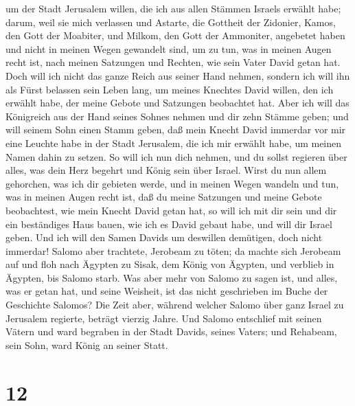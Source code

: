 um der Stadt Jerusalem willen, die ich aus allen Stämmen Israels erwählt
habe;  darum, weil sie mich verlassen und Astarte, die
Gottheit der Zidonier, Kamos, den Gott der Moabiter, und Milkom, den
Gott der Ammoniter, angebetet haben und nicht in meinen Wegen gewandelt
sind, um zu tun, was in meinen Augen recht ist, nach meinen Satzungen
und Rechten, wie sein Vater David getan hat.  Doch will
ich nicht das ganze Reich aus seiner Hand nehmen, sondern ich will ihn
als Fürst belassen sein Leben lang, um meines Knechtes David willen, den
ich erwählt habe, der meine Gebote und Satzungen beobachtet hat.
 Aber ich will das Königreich aus der Hand seines Sohnes
nehmen und dir zehn Stämme geben;  und will seinem Sohn
einen Stamm geben, daß mein Knecht David immerdar vor mir eine Leuchte
habe in der Stadt Jerusalem, die ich mir erwählt habe, um meinen Namen
dahin zu setzen.  So will ich nun dich nehmen, und du
sollst regieren über alles, was dein Herz begehrt und König sein über
Israel.  Wirst du nun allem gehorchen, was ich dir
gebieten werde, und in meinen Wegen wandeln und tun, was in meinen Augen
recht ist, daß du meine Satzungen und meine Gebote beobachtest, wie mein
Knecht David getan hat, so will ich mit dir sein und dir ein beständiges
Haus bauen, wie ich es David gebaut habe, und will dir Israel geben.
 Und ich will den Samen Davids um deswillen demütigen,
doch nicht immerdar!  Salomo aber trachtete, Jerobeam zu
töten; da machte sich Jerobeam auf und floh nach Ägypten zu Sisak, dem
König von Ägypten, und verblieb in Ägypten, bis Salomo starb.
 Was aber mehr von Salomo zu sagen ist, und alles, was er
getan hat, und seine Weisheit, ist das nicht geschrieben im Buche der
Geschichte Salomos?  Die Zeit aber, während welcher
Salomo über ganz Israel zu Jerusalem regierte, beträgt vierzig Jahre.
 Und Salomo entschlief mit seinen Vätern und ward
begraben in der Stadt Davids, seines Vaters; und Rehabeam, sein Sohn,
ward König an seiner Statt.

\hypertarget{section-11}{%
\section{12}\label{section-11}}

